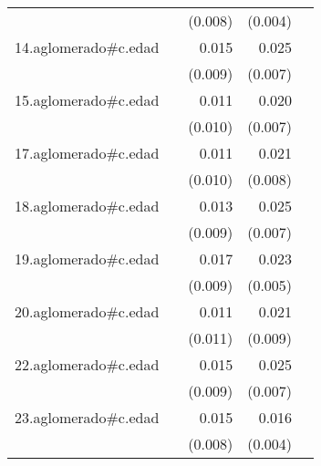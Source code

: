 {\begin{longtable}{l*{4}{D{.}{.}{-1}}}
            &                     &     (0.008)         &     (0.004)         &                     \\
\addlinespace
14.aglomerado#c.edad&                     &       0.015         &       0.025\sym{***}&                     \\
            &                     &     (0.009)         &     (0.007)         &                     \\
\addlinespace
15.aglomerado#c.edad&                     &       0.011         &       0.020\sym{**} &                     \\
            &                     &     (0.010)         &     (0.007)         &                     \\
\addlinespace
17.aglomerado#c.edad&                     &       0.011         &       0.021\sym{**} &                     \\
            &                     &     (0.010)         &     (0.008)         &                     \\
\addlinespace
18.aglomerado#c.edad&                     &       0.013         &       0.025\sym{***}&                     \\
            &                     &     (0.009)         &     (0.007)         &                     \\
\addlinespace
19.aglomerado#c.edad&                     &       0.017\sym{*}  &       0.023\sym{***}&                     \\
            &                     &     (0.009)         &     (0.005)         &                     \\
\addlinespace
20.aglomerado#c.edad&                     &       0.011         &       0.021\sym{*}  &                     \\
            &                     &     (0.011)         &     (0.009)         &                     \\
\addlinespace
22.aglomerado#c.edad&                     &       0.015         &       0.025\sym{***}&                     \\
            &                     &     (0.009)         &     (0.007)         &                     \\
\addlinespace
23.aglomerado#c.edad&                     &       0.015         &       0.016\sym{***}&                     \\
            &                     &     (0.008)         &     (0.004)         &                     \\

\end{longtable}}
